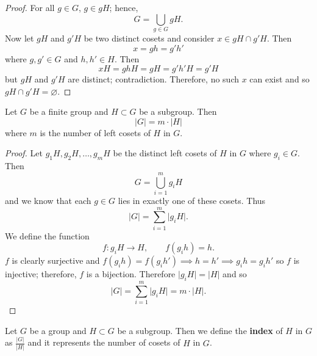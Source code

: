 \begin{proof}
    For all $g \in G$, $g \in gH$; hence, 
    \[
        G = \bigcup_{g \in G} gH.
    \]
    Now let $gH$ and $g'H$ be two distinct cosets and consider
    $x \in gH \cap g'H$. 
    Then 
    \[
        x = gh = g'h'
    \]
    where $g, g' \in G$ and $h, h' \in H$.
    Then
    \[
        xH = ghH = gH = g'h'H = g'H
    \]
    but $gH$ and $g'H$ are distinct; contradiction.
    Therefore, no such $x$ can exist
    and so $gH \cap g'H = \varnothing$.
\end{proof}

\begin{theorem}[Lagrange]
    Let $G$ be a finite group and $H \subset G$ be a subgroup.
    Then
    \[
        \lvert G \rvert = m \cdot \lvert H \rvert
    \]
    where $m$ is the number of left cosets of $H$ in $G$.
\end{theorem}

\begin{proof}
    Let $g_1H, g_2H, \ldots, g_mH$ be the distinct left cosets of $H$ in $G$
    where $g_i \in G$.
    Then
    \[
        G = \bigcup_{i = 1}^m g_iH
    \]
    and we know that each $g \in G$ lies in exactly one of these cosets.
    Thus
    \[
        \lvert G \rvert = \sum_{i = 1}^m \lvert g_iH \rvert.
    \]
    We define the function
    \[
        f: g_iH \to H, \qquad f(g_ih) = h.
    \]
    $f$ is clearly surjective and
    $f(g_ih) = f(g_ih') \implies h = h' \implies g_ih = g_ih'$ 
    so $f$ is injective; therefore, $f$ is a bijection.
    Therefore $\lvert g_iH \rvert = \lvert H \rvert$ and so
    \[
        \lvert G \rvert = \sum_{i = 1}^m \lvert g_i H \rvert
        = m \cdot \lvert H \rvert.
    \]
\end{proof}

\begin{definition}[Index]
    Let $G$ be a group and $H \subset G$ be a subgroup.
    Then we define the \textbf{index} of $H$ in $G$ as
    $
        \frac{\lvert G \rvert}{\lvert H \rvert}
    $
    and it represents the number of cosets of $H$ in $G$.
\end{definition}
